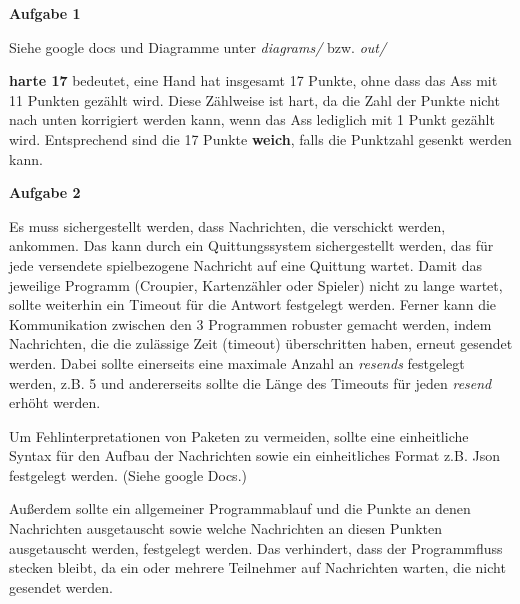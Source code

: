 \documentclass[a4paper, 12pt]{article}
\begin{document}
	\pagestyle{fancy}
	\fancyhead{}
	
	
	\parindent=0cm
	
	\large
	\textbf{Aufgabe 1}\par
	\normalsize
	\vspace{12pt}
	Siehe google docs und Diagramme unter \textit{diagrams/} bzw. \textit{out/}\par
	\vspace{6pt}
	\textbf{harte 17} bedeutet, eine Hand hat insgesamt 17 Punkte, ohne dass das Ass mit 11 Punkten gezählt wird. Diese Zählweise ist hart, da die Zahl der Punkte nicht nach unten korrigiert werden kann, wenn das Ass lediglich mit 1 Punkt gezählt wird. Entsprechend sind die 17 Punkte \textbf{weich}, falls die Punktzahl gesenkt werden kann.\par
	\vspace{24pt}
	
	\large
	\textbf{Aufgabe 2}\par
	\normalsize
	\vspace{12pt}
	
	Es muss sichergestellt werden, dass Nachrichten, die verschickt werden, ankommen. Das kann durch ein Quittungssystem sichergestellt werden, das für jede versendete spielbezogene Nachricht auf eine Quittung wartet. Damit das jeweilige Programm (Croupier, Kartenzähler oder Spieler) nicht zu lange wartet, sollte weiterhin ein Timeout für die Antwort festgelegt werden. Ferner kann die Kommunikation zwischen den 3 Programmen robuster gemacht werden, indem Nachrichten, die die zulässige Zeit (timeout) überschritten haben, erneut gesendet werden. Dabei sollte einerseits eine maximale Anzahl an \textit{resends} festgelegt werden, z.B. 5 und andererseits sollte die Länge des Timeouts für jeden \textit{resend} erhöht werden.\par
	Um Fehlinterpretationen von Paketen zu vermeiden, sollte eine einheitliche Syntax für den Aufbau der Nachrichten sowie ein einheitliches Format z.B. Json festgelegt werden. (Siehe google Docs.)\par
	Außerdem sollte ein allgemeiner Programmablauf und die Punkte an denen Nachrichten ausgetauscht sowie welche Nachrichten an diesen Punkten ausgetauscht werden, festgelegt werden. Das verhindert, dass der Programmfluss stecken bleibt, da ein oder mehrere Teilnehmer auf Nachrichten warten, die nicht gesendet werden.\par
	\vspace{24pt}
		
\end{document}
